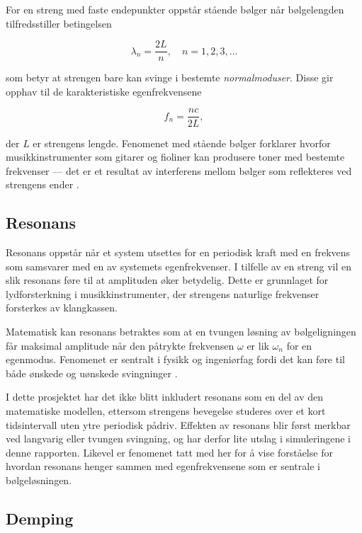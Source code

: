 For en streng med faste endepunkter oppstår stående bølger når bølgelengden tilfredsstiller betingelsen

\begin{equation*}
\lambda_n = \frac{2L}{n}, \quad n = 1, 2, 3, \dots
\end{equation*}

som betyr at strengen bare kan svinge i bestemte \textit{normalmoduser}.  
Disse gir opphav til de karakteristiske egenfrekvensene

\begin{equation*}
f_n = \frac{n c}{2L},
\end{equation*}

der $L$ er strengens lengde.  
Fenomenet med stående bølger forklarer hvorfor musikkinstrumenter som gitarer og fioliner kan produsere toner med bestemte frekvenser — det er et resultat av interferens mellom bølger som reflekteres ved strengens ender \parencite{libretextsStandingWaves}.

\subsection{Resonans}

Resonans oppstår når et system utsettes for en periodisk kraft med en frekvens som samsvarer med en av systemets egenfrekvenser.  
I tilfelle av en streng vil en slik resonans føre til at amplituden øker betydelig.  
Dette er grunnlaget for lydforsterkning i musikkinstrumenter, der strengens naturlige frekvenser forsterkes av klangkassen.  

Matematisk kan resonans betraktes som at en tvungen løsning av bølgeligningen får maksimal amplitude når den påtrykte frekvensen $\omega$ er lik $\omega_n$ for en egenmodus.  
Fenomenet er sentralt i fysikk og ingeniørfag fordi det kan føre til både ønskede og uønskede svingninger \parencite{libretextsStringResonance}.

I dette prosjektet har det ikke blitt inkludert resonans som en del av den matematiske modellen, ettersom strengens bevegelse studeres over et kort tidsintervall uten ytre periodisk pådriv.
Effekten av resonans blir først merkbar ved langvarig eller tvungen svingning, og har derfor lite utslag i simuleringene i denne rapporten.
Likevel er fenomenet tatt med her for å vise forståelse for hvordan resonans henger sammen med egenfrekvensene som er sentrale i bølgeløsningen.

\subsection{Demping}

